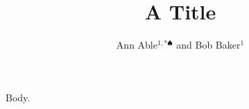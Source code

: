 \documentclass{revtex4-2}
\begin{document}
\title{A Title}
\author{Ann Able$^{1,*\spadesuit}$ and Bob Baker$^{1}$}
\maketitle
Body.
\end{document}
